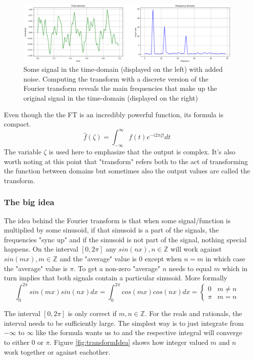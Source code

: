 \begin{figure}[ht]
    \centering
    \includegraphics[width=\textwidth]{./images/transform.png}
    \caption{Some signal in the time-domain (displayed on the left) with added noise. Computing the transform with a discrete version of the Fourier transform reveals the main frequencies that make up the original signal in the time-domain (displayed on the right)\label{fig:transform}}
\end{figure}

Even though the the FT is an incredibly powerful function, its formula is compact. 
$$\hat{f}(\zeta) = \int_{-\infty}^{\infty} f(t)e^{-i2\pi\zeta t} dt$$
The variable $\zeta$ is used here to emphasize that the output is complex. It's also worth noting at this point that "transform" refers both to the act of transforming the function between domains but sometimes also the output values are called the transform.

\subsubsection{The big idea}
The idea behind the Fourier transform is that when some signal/function is multiplied by some sinusoid, if that sinusoid is a part of the signals, the frequencies "sync up" and if the sinusoid is not part of the signal, nothing special happens. On the interval $[0, 2\pi]$ any $sin(nx), n\in\mathbb{Z}$ will work against $sin(mx), m\in\mathbb{Z}$ and the "average" value is 0 except when $n=m$ in which case the "average" value is $\pi$. To get a non-zero "average" $n$ needs to equal $m$ which in turn implies that both signals contain a particular sinusoid. More formally 
\[ \int_0^{2\pi} sin(mx)sin(nx)dx = \int_0^{2\pi} cos(mx)cos(nx)dx= 
\begin{cases} %
      0 & m\neq n \\
      \pi & m=n
   \end{cases} 
\]

The interval $[0, 2\pi]$ is only correct if $m, n \in \mathbb{Z}$. For the reals and rationals, the interval needs to be sufficiently large. The simplest way is to just integrate from $-\infty$ to $\infty$ like the formula wants us to and the respective integral will converge to either $0$ or $\pi$. Figure \ref{fig:transformIdea} shows how integer valued $m$ and $n$ work together or against eachother.

